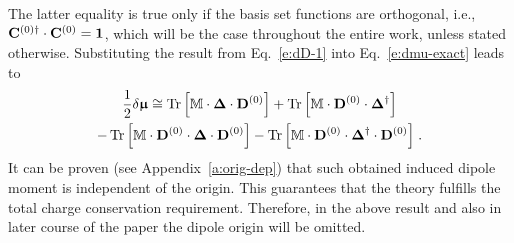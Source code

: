 \documentclass[aip,amsmath,amssymb,reprint,floatfix]{revtex4-1}
\newcommand{\BM}[1]{\bm{#1}}
\DeclareMathOperator{\Tr}{Tr}
\begin{document}
%
The latter equality is true only if the basis set functions are orthogonal, i.e., 
${\bf C}^{(0)\dagger} \cdot {\bf C}^{(0)}={\bf 1}$,
which will be the case throughout the entire work, unless stated otherwise.
Substituting the result from Eq.~\eqref{e:dD-1}
into Eq.~\eqref{e:dmu-exact} leads to
%
\begin{multline} \label{e:dmu-4-exact.linear-approximation}
 \frac{1}{2} 
 \delta {\BM{\upmu}}
  \cong
   \Tr{ 
    \left[ 
         {\mathbb{M}} \cdot {\BM\Delta} \cdot {\bf D}^{(0)}  
    \right] }
%
  +\Tr{ 
    \left[ 
         {\mathbb{M}} \cdot {\bf D}^{(0)} \cdot {\BM\Delta}^{\dagger}
    \right] } \\
%
  -\Tr{ 
    \left[ 
         {\mathbb{M}} \cdot {\bf D}^{(0)} \cdot {\BM\Delta} \cdot {\bf D}^{(0)}
    \right] }
%
  -\Tr{ 
    \left[ 
         {\mathbb{M}} \cdot {\bf D}^{(0)} \cdot {\BM\Delta}^{\dagger} \cdot {\bf D}^{(0)}
    \right] } \;.
\end{multline}
%
It can be proven (see Appendix~\ref{a:orig-dep}) that such obtained
induced dipole moment is independent of the origin. 
This guarantees that the theory fulfills the total charge conservation requirement.
Therefore,
in the above result and also in later course of the paper the dipole origin will be omitted. 
\end{document}
